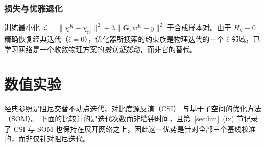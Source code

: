 \documentclass[UTF8,a4paper,11pt]{ctexart}
\newcommand{\norm}[1]{\lVert #1 \rVert}
\begin{document}
\subsubsection{损失与优雅退化}
训练最小化
$\mathcal{L}=\norm{\chi^{K}-\chi_{\mathrm{gt}}}^2+\lambda\norm{\mathbf{G}_sw^{K}-y}^2$
于合成样本对。由于 $H_k\equiv0$ 精确恢复经典迭代（$\bar\epsilon=0$），优化器所搜索的约束族是物理迭代的一个 $\bar\epsilon$-邻域，已学习网络是一个收敛物理方案的\emph{被认证扰动}，而非它的替代。

\section{数值实验}\label{sec:exp}
经典参照是阻尼交替不动点迭代、对比度源反演（CSI）\cite{csi_lit} 与基于子空间的优化方法（SOM）\cite{som_lit}。
下面的比较计的是迭代次数而非墙钟时间，且第~\ref{sec:lim}~(ix) 节记录了 CSI 与 SOM 也保持在展开网络之上，因此这一优势是针对全部三个基线校准的，而非仅针对阻尼迭代。
\end{document}
